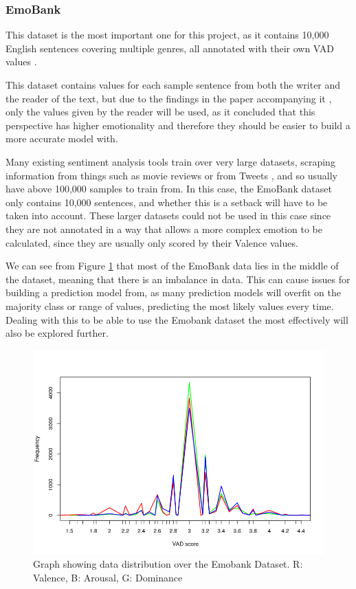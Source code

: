 \subsubsection{EmoBank}
This dataset is the most important one for this project, as it contains 10,000 English sentences covering multiple genres, all annotated with their own VAD values \cite{emoBank}.

This dataset contains values for each sample sentence from both the writer and the reader of the text, but due to the findings in the paper accompanying it \cite{emoBank}, only the values given by the reader will be used, as it concluded that this perspective has higher emotionality and therefore they should be easier to build a more accurate model with.

Many existing sentiment analysis tools train over very large datasets, scraping information from things such as movie reviews \cite{socher2013recursive} or from Tweets \cite{towardsDS}, and so usually have above 100,000 samples to train from. In this case, the EmoBank dataset only contains 10,000 sentences, and whether this is a setback will have to be taken into account. These larger datasets could not be used in this case since they are not annotated in a way that allows a more complex emotion to be calculated, since they are usually only scored by their Valence values. 

We can see from Figure \ref{dist:vad} that most of the EmoBank data lies in the middle of the dataset, meaning that there is an imbalance in data. This can cause issues for building a prediction model from, as many prediction models will overfit on the majority class or range of values, predicting the most likely values every time. Dealing with this to be able to use the Emobank dataset the most effectively will also be explored further.

\begin{figure}[h]
\centering
\includegraphics[scale=0.5]{graphs/VADdistribution.png}
\caption{Graph showing data distribution over the Emobank Dataset. R: Valence, B: Arousal, G: Dominance}
\label{dist:vad}
\end{figure}

